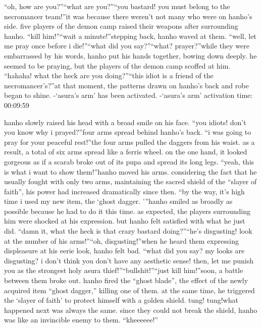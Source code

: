 “oh, how are you?”“what are you?”“you bastard! you must belong to the necromancer team!”it was because there weren’t not many who were on hanho’s side.
five players of the demon camp raised their weapons after surrounding hanho.
“kill him!”“wait a minute!”stepping back, hanho waved at them.
“well, let me pray once before i die!”“what did you say?”“what? prayer?”while they were embarrassed by his words, hanho put his hands together, bowing down deeply.
 he seemed to be praying, but the players of the demon camp scoffed at him.
“hahaha! what the heck are you doing?”“this idiot is a friend of the necromancer’s?”at that moment, the patterns drawn on hanho’s back and robe began to shine.
-‘asura’s arm’ has been activated.
-‘asura’s arm’ activation time: 00:09:59

hanho slowly raised his head with a broad smile on his face.
“you idiots! don’t you know why i prayed?”four arms spread behind hanho’s back.
“i was going to pray for your peaceful rest!”the four arms pulled the daggers from his waist.
as a result, a total of six arms spread like a ferris wheel.
on the one hand, it looked gorgeous as if a scarab broke out of its pupa and spread its long legs.
“yeah, this is what i want to show them!”hanho moved his arms.
 considering the fact that he usually fought with only two arms, maintaining the sacred shield of the “slayer of faith”, his power had increased dramatically since then.
“by the way, it’s high time i used my new item, the ‘ghost dagger.
'”hanho smiled as broadly as possible because he had to do it this time.
as expected, the players surrounding him were shocked at his expression.
but hanho felt satisfied with what he just did.
“damn it, what the heck is that crazy bastard doing?”“he’s disgusting! look at the number of his arms!”“oh, disgusting!”when he heard them expressing displeasure at his eerie look, hanho felt bad.
“what did you say? my looks are disgusting? i don’t think you don’t have any aesthetic sense! then, let me punish you as the strongest holy asura thief!”“bullshit!”“just kill him!”soon, a battle between them broke out.
hanho fired the “ghost blade”, the effect of the newly acquired item “ghost dagger,” killing one of them.
 at the same time, he triggered the ‘slayer of faith’ to protect himself with a golden shield.
tung! tung!what happened next was always the same.
 since they could not break the shield, hanho was like an invincible enemy to them.
“kheeeeee!”

 